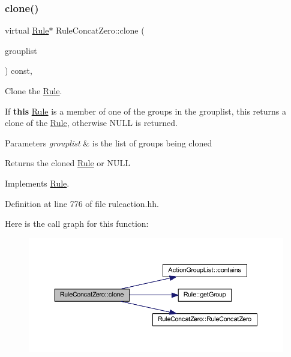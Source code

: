 \subsubsection{\texorpdfstring{clone()}{clone()}}
{\footnotesize\ttfamily virtual \mbox{\hyperlink{class_rule}{Rule}}$\ast$ Rule\+Concat\+Zero\+::clone (\begin{DoxyParamCaption}\item[{const \mbox{\hyperlink{class_action_group_list}{Action\+Group\+List}} \&}]{grouplist }\end{DoxyParamCaption}) const\hspace{0.3cm}{\ttfamily [inline]}, {\ttfamily [virtual]}}



Clone the \mbox{\hyperlink{class_rule}{Rule}}. 

If {\bfseries{this}} \mbox{\hyperlink{class_rule}{Rule}} is a member of one of the groups in the grouplist, this returns a clone of the \mbox{\hyperlink{class_rule}{Rule}}, otherwise N\+U\+LL is returned. 
\begin{DoxyParams}{Parameters}
{\em grouplist} & is the list of groups being cloned \\
\hline
\end{DoxyParams}
\begin{DoxyReturn}{Returns}
the cloned \mbox{\hyperlink{class_rule}{Rule}} or N\+U\+LL 
\end{DoxyReturn}


Implements \mbox{\hyperlink{class_rule_a70de90a76461bfa7ea0b575ce3c11e4d}{Rule}}.



Definition at line 776 of file ruleaction.\+hh.

Here is the call graph for this function\+:
\nopagebreak
\begin{figure}[H]
\begin{center}
\leavevmode
\includegraphics[width=350pt]{class_rule_concat_zero_a7f38ae898d28aa1ae805fc66147fd627_cgraph}
\end{center}
\end{figure}
\mbox{\label{class_rule_concat_zero_aee53d409d1e5e17a2a22b8a97ef0abc0}} 

